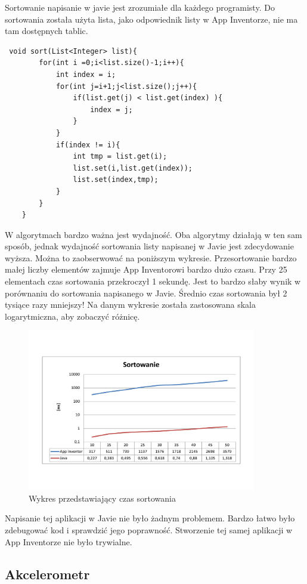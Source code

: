 Sortowanie napisanie w javie jest zrozumiałe dla każdego programisty. Do sortowania została użyta lista, jako odpowiednik listy w App Inventorze, nie ma tam dostępnych tablic.


\begin{lstlisting}
 void sort(List<Integer> list){
        for(int i =0;i<list.size()-1;i++){
            int index = i;
            for(int j=i+1;j<list.size();j++){
                if(list.get(j) < list.get(index) ){
                    index = j;
                }
            }
            if(index != i){
                int tmp = list.get(i);
                list.set(i,list.get(index));
                list.set(index,tmp);
            }
        }
    }
\end{lstlisting}

W algorytmach bardzo ważna jest wydajność. Oba algorytmy działają w ten sam sposób, jednak wydajność sortowania listy napisanej w Javie jest zdecydowanie wyższa. Można to zaobserwować na poniższym wykresie. Przesortowanie bardzo małej liczby elementów zajmuje App Inventorowi bardzo dużo czasu. Przy 25 elementach czas sortowania przekroczył 1 sekundę. Jest to bardzo słaby wynik w porównaniu do sortowania napisanego w Javie. Średnio czas sortowania był 2 tysiące razy mniejszy! Na danym wykresie została zastosowana skala logarytmiczna, aby zobaczyć różnicę.

\begin{figure}[htbp]
\centering\includegraphics[width=10cm]{figures/apps/sortChart}
\caption{Wykres przedstawiający czas sortowania}
\end{figure}

Napisanie tej aplikacji w Javie nie było żadnym problemem. Bardzo łatwo było zdebugować kod i sprawdzić jego poprawność. Stworzenie tej samej aplikacji w App Inventorze nie było trywialne.


\subsection{Akcelerometr}

